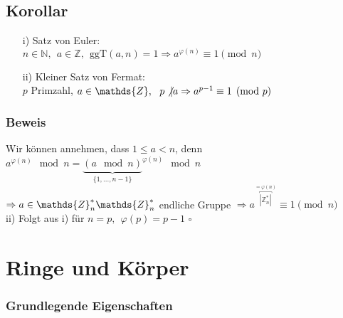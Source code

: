 \documentclass[12pt,titlepage, pdf]{article}
\renewcommand{\>}{\rightarrow}
\renewcommand{\*}{\cdot}
\renewcommand{\phi}{\varphi}
\begin{document}
	\subsection{Korollar}
	\begin{itemize}
		\item[i)] Satz von Euler:\\ $n \in \mathds{N},~~ a \in \mathds{Z},~~ \text{ggT}(a,n) = 1 \Rightarrow a^{\phi(n)} \equiv 1 \pmod{n}$
		\item[ii)] Kleiner Satz von Fermat:\\ $p$ Primzahl, $a \in \mathds{Z},~~ p \not\vert a \Rightarrow a^{p-1} \equiv 1 \pmod{p}$
	\end{itemize}
	\subsubsection*{Beweis}
	Wir können annehmen, dass $1 \leq a < n$, denn \\$a^{\phi(n)} \mod n = {\underbrace{(a \mod n)}_{\{1,...,n-1\}}}^{\phi(n)}\mod n$ \\
	$\Rightarrow a \in \mathds{Z}^*_n \\
	\mathds{Z}^*_n$ endliche Gruppe $\Rightarrow a^{\overbracket{|\mathds{Z}^*_n|}^{ = \phi(n)}} \equiv 1 \pmod{n}$\\
	ii) Folgt aus i) für $n = p,~~ \phi(p) = p-1$
	\hfill$\square$
	\newpage
	\section{Ringe und Körper}
	\subsubsection*{Grundlegende Eigenschaften}
\end{document}
